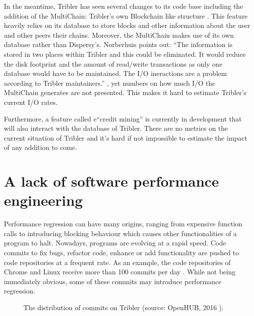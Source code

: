 In the meantime, Tribler has seen several changes to its code base including the addition of the MultiChain: Tribler's own Blockchain like structure \cite{norberhuis2015multichain}.
This feature heavily relies on its database to store blocks and other information about the user and other peers their chains.
Moreover, the MultiChain makes use of its own database rather than Dispersy's.
Norberhuis points out: \enquote{The information is stored in two places within Tribler and this could be eliminated. It would reduce the disk footprint and the amount of read/write transactions as only one database would have to be maintained. The I/O ineractions are a problem according to Tribler maintainers.} \cite{norberhuis2015multichain}, yet numbers on how much I/O the MultiChain generates are not presented.
This makes it hard to estimate Tribler's current I/O rates.

Furthermore, a feature called e\enquote{credit mining} is currently in development that will also interact with the database of Tribler.
There are no metrics on the current situation of Tribler and it's hard if not impossible to estimate the impact of any addition to come.


\section{A lack of software performance engineering}

Performance regression can have many origins, ranging from expensive function calls to introducing blocking behaviour which causes other functionalities of a program to halt.
Nowadays, programs are evolving at a rapid speed.
Code commits to fix bugs, refactor code, enhance or add functionality are pushed to code repositories at a frequent rate.
As an example, the code repositories of Chrome and Linux receive more than 100 commits per day \cite{huang2014performance}.
While not being immediately obvious, some of these commits may introduce performance regression.

\begin{figure}[!h]
	\caption{The distribution of commits on Tribler (source: OpenHUB, 2016 \cite{openhub2016tribler}).}
	\label{fig:commits_openhub}
\end{figure}

